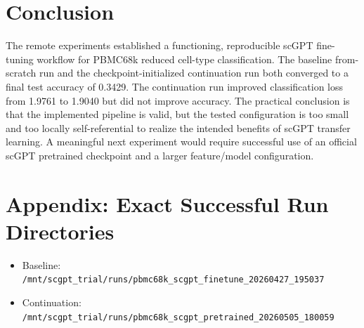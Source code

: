 \documentclass[11pt]{article}
\begin{document}
\section{Conclusion}
The remote experiments established a functioning, reproducible scGPT fine-tuning workflow for PBMC68k reduced cell-type classification. The baseline from-scratch run and the checkpoint-initialized continuation run both converged to a final test accuracy of 0.3429. The continuation run improved classification loss from 1.9761 to 1.9040 but did not improve accuracy. The practical conclusion is that the implemented pipeline is valid, but the tested configuration is too small and too locally self-referential to realize the intended benefits of scGPT transfer learning. A meaningful next experiment would require successful use of an official scGPT pretrained checkpoint and a larger feature/model configuration.

\section*{Appendix: Exact Successful Run Directories}
\begin{itemize}
    \item Baseline: \texttt{/mnt/scgpt\_trial/runs/pbmc68k\_scgpt\_finetune\_20260427\_195037}
    \item Continuation: \texttt{/mnt/scgpt\_trial/runs/pbmc68k\_scgpt\_pretrained\_20260505\_180059}
\end{itemize}
\end{document}
